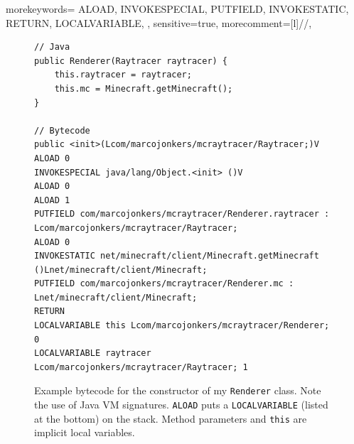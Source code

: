 \documentclass[]{article}
\begin{document}
{
  morekeywords={
    ALOAD,
    INVOKESPECIAL,
    PUTFIELD,
    INVOKESTATIC,
    RETURN,
    LOCALVARIABLE,
  },
  sensitive=true, %
  morecomment=[l]{//}, %
}
\begin{figure}
\begin{lstlisting}[breaklines,frame=single]
// Java
public Renderer(Raytracer raytracer) {
    this.raytracer = raytracer;
    this.mc = Minecraft.getMinecraft();
}

// Bytecode
public <init>(Lcom/marcojonkers/mcraytracer/Raytracer;)V
ALOAD 0
INVOKESPECIAL java/lang/Object.<init> ()V
ALOAD 0
ALOAD 1
PUTFIELD com/marcojonkers/mcraytracer/Renderer.raytracer : Lcom/marcojonkers/mcraytracer/Raytracer;
ALOAD 0
INVOKESTATIC net/minecraft/client/Minecraft.getMinecraft ()Lnet/minecraft/client/Minecraft;
PUTFIELD com/marcojonkers/mcraytracer/Renderer.mc : Lnet/minecraft/client/Minecraft;
RETURN
LOCALVARIABLE this Lcom/marcojonkers/mcraytracer/Renderer; 0
LOCALVARIABLE raytracer Lcom/marcojonkers/mcraytracer/Raytracer; 1
\end{lstlisting}
\caption[Example bytecode]{Example bytecode for the constructor of my \texttt{Renderer} class. Note the use of Java VM signatures. \texttt{ALOAD} puts a \texttt{LOCALVARIABLE} (listed at the bottom) on the stack. Method parameters and \texttt{this} are implicit local variables.}
\label{fig:bytecode}
\end{figure}
\end{document}

